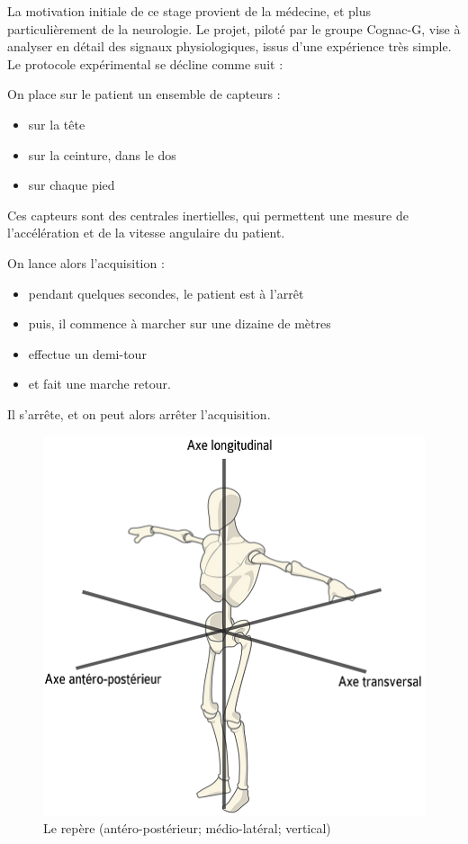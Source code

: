 \documentclass[french,11pt,notitlepage]{report}
\begin{document}
	
		La motivation initiale de ce stage provient de la médecine,
		et plus particulièrement de la neurologie.
		Le projet, piloté par le groupe Cognac-G,
		vise à analyser en détail des signaux physiologiques,
		issus d'une expérience très simple.
		Le protocole expérimental se décline comme suit :
		
		On place sur le patient un ensemble de capteurs :
	\begin{itemize}
		\item sur la tête
		\item sur la ceinture, dans le dos
		\item sur chaque pied
	\end{itemize}	
	
		Ces capteurs sont des centrales inertielles, qui permettent une mesure de l'accélération et de la vitesse angulaire du patient.

		On lance alors l'acquisition :
	\begin{itemize}
		\item pendant quelques secondes, le patient est à l'arrêt
		\item puis, il commence à marcher sur une dizaine de mètres
		\item effectue un demi-tour
		\item et fait une marche retour.
	\end{itemize}
		
	Il s'arrête, et on peut alors arrêter l'acquisition.

	\begin{figure}[!h]
		\hspace{5.6cm}\includegraphics[scale=0.3]{axis.png}
		\caption{Le repère (antéro-postérieur; médio-latéral; vertical)}
		\label{axis}
	\end{figure}
	
\end{document}
